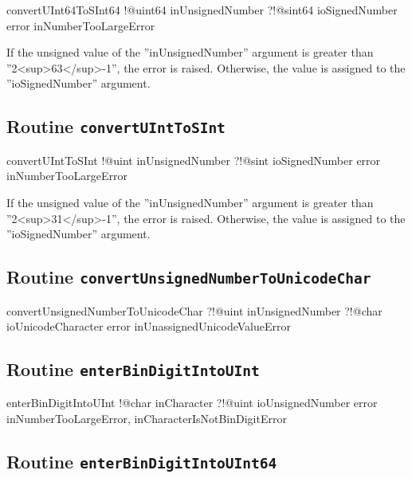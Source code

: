 {\begin{galgascode}
convertUInt64ToSInt64 !@uint64 inUnsignedNumber
                      ?!@sint64 ioSignedNumber
                      error inNumberTooLargeError
\end{galgascode}

If the unsigned value of the ''inUnsignedNumber'' argument is greater than ''2<sup>63</sup>-1'', the error is raised. Otherwise, the value is assigned to the ''ioSignedNumber'' argument.

\subsection{Routine \texttt{convertUIntToSInt}}

\begin{galgascode}
convertUIntToSInt !@uint inUnsignedNumber
                  ?!@sint ioSignedNumber
                  error inNumberTooLargeError
\end{galgascode}

If the unsigned value of the ''inUnsignedNumber'' argument is greater than ''2<sup>31</sup>-1'', the error is raised. Otherwise, the value is assigned to the ''ioSignedNumber'' argument.

\subsection{Routine \texttt{convertUnsignedNumberToUnicodeChar}}

\begin{galgascode}
convertUnsignedNumberToUnicodeChar ?!@uint inUnsignedNumber
                                   ?!@char ioUnicodeCharacter
                                   error inUnassignedUnicodeValueError
\end{galgascode}

\subsection{Routine \texttt{enterBinDigitIntoUInt}}

\begin{galgascode}
enterBinDigitIntoUInt !@char inCharacter
                      ?!@uint ioUnsignedNumber
                      error inNumberTooLargeError,
                            inCharacterIsNotBinDigitError
\end{galgascode}

\subsection{Routine \texttt{enterBinDigitIntoUInt64}}

}
